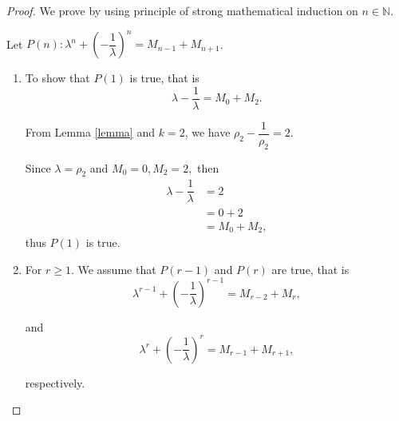 \documentclass{rmutt-seminar}
\begin{document}
\begin{proof}
We prove by using principle of strong mathematical induction on $n \in \mathbb{N}.$

\quad Let $P(n):\lambda^n + \left(-\dfrac{1}{\lambda}\right)^n = M_{n-1} + M_{n+1}$. 
\begin{enumerate}[label=(\roman*),leftmargin = 1.5cm]
	\item To show  that $P(1)$ is true, that is 
	$$\lambda - \dfrac{1}{\lambda} = M_{0} + M_{2}.$$

 From Lemma \ref{lemma} and $k=2$, we have $\rho_2 - \dfrac{1}{\rho_2} =2. $
 
 Since $ \lambda = \rho_2$ and $M_0=0, M_2=2,$ then 
  \begin{align*}
 	\lambda - \dfrac{1}{\lambda} &= 2\\
 	&= 0 + 2\\
 	&= M_{0} + M_{2},
 \end{align*}
 thus  $P(1)$  is true.
 
 \item For $r \geq 1$. We assume that $P(r-1)$ and $P(r)$ are true, that is
 \begin{equation*}
 	\lambda^{r-1} + \left(-\dfrac{1}{\lambda}\right)^{r-1} = M_{r-2} + M_{r}, 
 \end{equation*}
 
 and 
\begin{equation*}
	\lambda^{r} + \left(-\dfrac{1}{\lambda}\right)^{r} = M_{r-1} + M_{r+1},
\end{equation*}

respectively.


\end{enumerate}
\end{proof}
\end{document}
